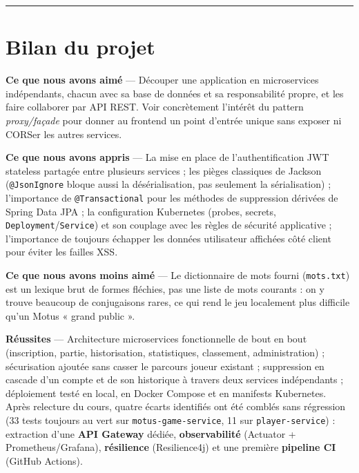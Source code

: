 \documentclass[a4paper,11pt]{article}
\begin{document}
\vspace{0.5em}\hrule\vspace{0.7em}

\section{Bilan du projet}

\textbf{Ce que nous avons aim\'e} --- D\'ecouper une application en microservices ind\'ependants, chacun avec sa base de donn\'ees et sa responsabilit\'e propre, et les faire collaborer par API REST. Voir concr\`etement l'int\'er\^et du pattern \emph{proxy/fa\c{c}ade} pour donner au frontend un point d'entr\'ee unique sans exposer ni CORSer les autres services.

\textbf{Ce que nous avons appris} --- La mise en place de l'authentification JWT stateless partag\'ee entre plusieurs services ; les pi\`eges classiques de Jackson (\texttt{@JsonIgnore} bloque aussi la d\'es\'erialisation, pas seulement la s\'erialisation) ; l'importance de \texttt{@Transactional} pour les m\'ethodes de suppression d\'eriv\'ees de Spring Data JPA ; la configuration Kubernetes (probes, secrets, \texttt{Deployment}/\texttt{Service}) et son couplage avec les r\`egles de s\'ecurit\'e applicative ; l'importance de toujours \'echapper les donn\'ees utilisateur affich\'ees c\^ot\'e client pour \'eviter les failles XSS.

\textbf{Ce que nous avons moins aim\'e} --- Le dictionnaire de mots fourni (\texttt{mots.txt}) est un lexique brut de formes fl\'echies, pas une liste de mots courants : on y trouve beaucoup de conjugaisons rares, ce qui rend le jeu localement plus difficile qu'un Motus « grand public ».

\textbf{R\'eussites} --- Architecture microservices fonctionnelle de bout en bout (inscription, partie, historisation, statistiques, classement, administration) ; s\'ecurisation ajout\'ee sans casser le parcours joueur existant ; suppression en cascade d'un compte et de son historique \`a travers deux services ind\'ependants ; d\'eploiement test\'e en local, en Docker Compose et en manifests Kubernetes. Apr\`es relecture du cours, quatre \'ecarts identifi\'es ont \'et\'e combl\'es sans r\'egression (33 tests toujours au vert sur \texttt{motus-game-service}, 11 sur \texttt{player-service}) : extraction d'une \textbf{API Gateway} d\'edi\'ee, \textbf{observabilit\'e} (Actuator + Prometheus/Grafana), \textbf{r\'esilience} (Resilience4j) et une premi\`ere \textbf{pipeline CI} (GitHub Actions).
\end{document}
